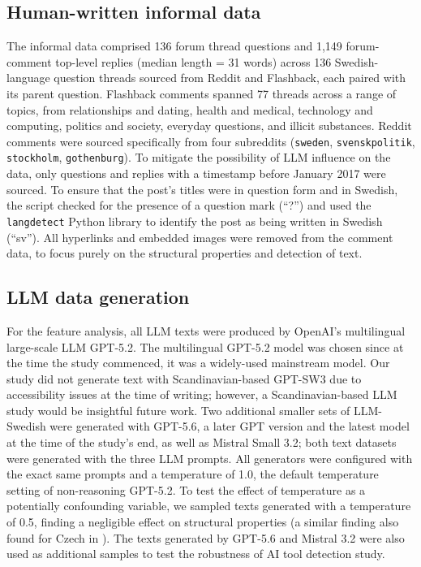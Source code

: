 \documentclass[thesis]{cluu}
\begin{document}
\subsection{Human-written informal data}

The informal data comprised 136 forum thread questions and 1,149 forum-comment top-level replies (median length = 31 words) across 136 Swedish-language question threads sourced from Reddit and Flashback, each paired with its parent question. Flashback comments spanned 77 threads across a range of topics, from relationships and dating, health and medical, technology and computing, politics and society, everyday questions, and illicit substances. Reddit comments were sourced specifically from four subreddits (\texttt{sweden}, \texttt{svenskpolitik}, \texttt{stockholm}, \texttt{gothenburg}). To mitigate the possibility of LLM influence on the data, only questions and replies with a timestamp before January 2017 were sourced. To ensure that the post's titles were in question form and in Swedish, the script checked for the presence of a question mark (``?'') and used the \texttt{langdetect} Python library to identify the post as being written in Swedish (``sv''). All hyperlinks and embedded images were removed from the comment data, to focus purely on the structural properties and detection of text.

\subsection{LLM data generation}

For the feature analysis, all LLM texts were produced by OpenAI's multilingual large-scale LLM GPT-5.2. The multilingual GPT-5.2 model was chosen since at the time the study commenced, it was a widely-used mainstream model. Our study did not generate text with Scandinavian-based GPT-SW3 due to accessibility issues at the time of writing; however, a Scandinavian-based LLM study would be insightful future work. Two additional smaller sets of LLM-Swedish were generated with GPT-5.6, a later GPT version and the latest model at the time of the study's end, as well as Mistral Small 3.2; both text datasets were generated with the three LLM prompts. All generators were configured with the exact same prompts and a temperature of 1.0, the default temperature setting of non-reasoning GPT-5.2. To test the effect of temperature as a potentially confounding variable, we sampled texts generated with a temperature of 0.5, finding a negligible effect on structural properties (a similar finding also found for Czech in \textcite{milicka2024benchmark}). The texts generated by GPT-5.6 and Mistral 3.2 were also used as additional samples to test the robustness of AI tool detection study.
\end{document}
